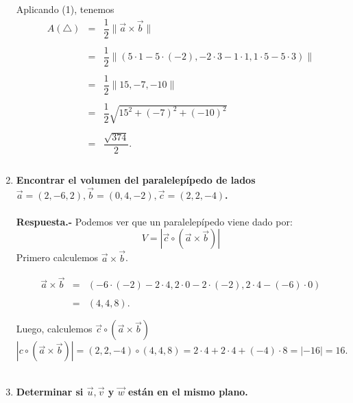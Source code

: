 \begin{enumerate}
    Aplicando (1), tenemos 
    $$\begin{array}{rcl}
	A(\triangle)&=&\dfrac{1}{2}\|\vec{a}\times \vec{b}\|\\\\
		    &=&\dfrac{1}{2}\|\left(5\cdot 1 - 5\cdot (-2),-2\cdot 3 - 1\cdot 1, 1\cdot 5 - 5\cdot 3\right)\|\\\\
		    &=&\dfrac{1}{2}\|15,-7,-10\|\\\\
		    &=&\dfrac{1}{2}\sqrt{15^2+(-7)^2+(-10)^2}\\\\
		    &=&\dfrac{\sqrt{374}}{2}.\\\\
    \end{array}$$

\item \textbf{\boldmath Encontrar el volumen del paralelepípedo de lados $\vec{a}=(2,-6,2),\vec{b}=(0,4,-2),\vec{c}=(2,2,-4)$.\\\\
    Respuesta.-}
    Podemos ver que un paralelepípedo viene dado por:
    $$V = |\vec{c}\circ (\vec{a}\times \vec{b})|$$
    Primero calculemos $\vec{a}\times \vec{b}$.

    $$\begin{array}{rcl}
	\vec{a}\times \vec{b} &=& \left(-6\cdot (-2) - 2\cdot 4, 2\cdot 0 - 2\cdot (-2), 2\cdot 4 - (-6)\cdot 0\right)\\\\
			      &=& (4,4,8).\\\\
    \end{array}$$
    Luego, calculemos $\vec{c}\circ (\vec{a}\times \vec{b})$
    $$|c\circ (\vec{a}\times \vec{b})|=(2,2,-4)\circ (4,4,8) = 2\cdot 4 + 2\cdot 4 + (-4)\cdot 8 = |-16|=16.$$\\



\item \textbf{\boldmath Determinar si $\vec{u},\vec{v}$ y $\vec{w}$ están en el mismo plano.}

    \begin{enumerate}[(a)]


\end{enumerate}
\end{enumerate}

